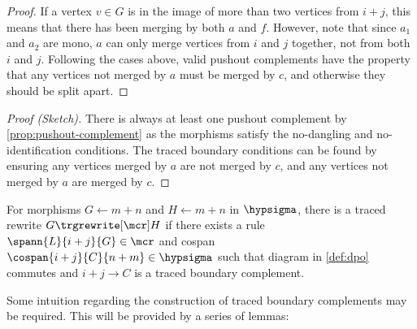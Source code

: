 {\begin{proof}
        If a vertex \(v \in G\) is in the image of more than two vertices from
        \(i + j\), this means that there has been merging by both \(a\) and
        \(f\).
        However, note that since \(a_1\) and \(a_2\) are mono, \(a\) can only
        merge vertices from \(i\) and \(j\) together, not from both \(i\) and
        \(j\).
        Following the cases above, valid pushout complements have the property
        that any vertices not merged by \(a\) must be merged by \(c\), and
        otherwise they should be split apart.
    \end{proof}
}{
    \begin{proof}[Proof (Sketch)]
        There is always at least one pushout complement by
        \cref{prop:pushout-complement} as the morphisms satisfy the no-dangling
        and no-identification conditions.
        The traced boundary conditions can be found by ensuring any
        vertices merged by \(a\) are not merged by \(c\), and any vertices
        not merged by \(a\) are merged by \(c\).
    \end{proof}
}

\begin{definition}
    For morphisms \(G \leftarrow m+n\) and \(H \leftarrow m+n\) in
    \(\hypsigma\), there is a traced rewrite \(G \trgrewrite[\mcr] H\) if there
    exists a rule \(
        \spann{L}{i+j}{G} \in \mcr
    \) and cospan \(
        \cospan{i+j}{C}{n+m} \in \hypsigma
    \) such that diagram in \cref{def:dpo} commutes and \(i+j \to C\) is a
    traced boundary complement.
\end{definition}

Some intuition regarding the construction of traced boundary complements may be
required.
This will be provided by a series of lemmas:

